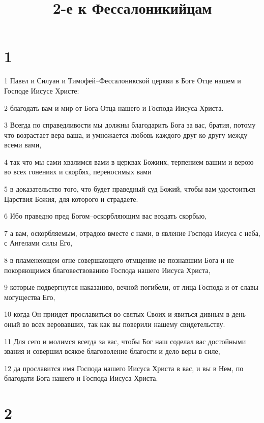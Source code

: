 

\title{2-е к Фессалоникийцам}


\chapter{1}

\par 1 Павел и Силуан и Тимофей--Фессалоникской церкви в Боге Отце нашем и Господе Иисусе Христе:
\par 2 благодать вам и мир от Бога Отца нашего и Господа Иисуса Христа.
\par 3 Всегда по справедливости мы должны благодарить Бога за вас, братия, потому что возрастает вера ваша, и умножается любовь каждого друг ко другу между всеми вами,
\par 4 так что мы сами хвалимся вами в церквах Божиих, терпением вашим и верою во всех гонениях и скорбях, переносимых вами
\par 5 в доказательство того, что будет праведный суд Божий, чтобы вам удостоиться Царствия Божия, для которого и страдаете.
\par 6 Ибо праведно пред Богом--оскорбляющим вас воздать скорбью,
\par 7 а вам, оскорбляемым, отрадою вместе с нами, в явление Господа Иисуса с неба, с Ангелами силы Его,
\par 8 в пламенеющем огне совершающего отмщение не познавшим Бога и не покоряющимся благовествованию Господа нашего Иисуса Христа,
\par 9 которые подвергнутся наказанию, вечной погибели, от лица Господа и от славы могущества Его,
\par 10 когда Он приидет прославиться во святых Своих и явиться дивным в день оный во всех веровавших, так как вы поверили нашему свидетельству.
\par 11 Для сего и молимся всегда за вас, чтобы Бог наш соделал вас достойными звания и совершил всякое благоволение благости и дело веры в силе,
\par 12 да прославится имя Господа нашего Иисуса Христа в вас, и вы в Нем, по благодати Бога нашего и Господа Иисуса Христа.

\chapter{2}

